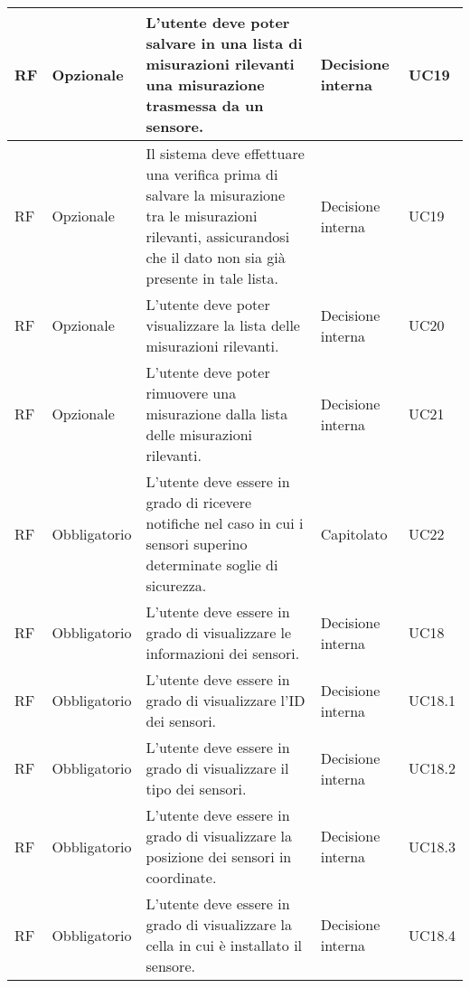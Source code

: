 \begin{longtable}{|C{1cm}|C{2cm}|>{\raggedright}m{5cm}|C{2cm}|C{1.5cm}|}
    \hline
     RF & Opzionale & L'utente deve poter salvare in una lista di misurazioni rilevanti una misurazione trasmessa da un sensore. & Decisione interna & UC19 \\
    
    \hline
     RF & Opzionale & Il sistema deve effettuare una verifica prima di salvare la misurazione tra le misurazioni rilevanti, assicurandosi che il dato non sia già presente in tale lista. & Decisione interna & UC19  \\

    \hline
     RF & Opzionale & L'utente deve poter visualizzare la lista delle misurazioni rilevanti. & Decisione interna & UC20 \\

    \hline
     RF & Opzionale & L'utente deve poter rimuovere una misurazione dalla lista delle misurazioni rilevanti. & Decisione interna & UC21 \\

    \hline
     RF & Obbligatorio & L'utente deve essere in grado di ricevere notifiche nel caso in cui i sensori superino determinate soglie di sicurezza. & Capitolato & UC22 \\
    \hline

     RF & Obbligatorio & L'utente deve essere in grado di visualizzare le informazioni dei sensori. & Decisione interna & UC18 \\

    \hline
     RF & Obbligatorio & L'utente deve essere in grado di visualizzare l'ID dei sensori. & Decisione interna  & UC18.1 \\

    \hline
     RF & Obbligatorio & L'utente deve essere in grado di visualizzare il tipo dei sensori. & Decisione interna & UC18.2 \\
    \hline
     RF & Obbligatorio & L'utente deve essere in grado di visualizzare la posizione dei sensori in coordinate. & Decisione interna & UC18.3 \\
    
    \hline
     RF & Obbligatorio & L'utente deve essere in grado di visualizzare la cella in cui è installato il sensore. & Decisione interna & UC18.4 \\


\end{longtable}
